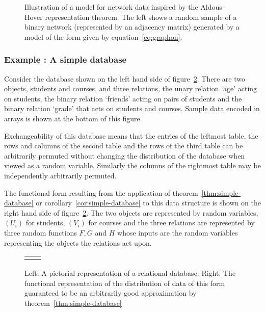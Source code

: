 \begin{figure}[ht]
\centering
\begin{tabular}{c}

\end{tabular}
\caption[Illustration of the Aldous--Hoover representation of a network.]{
Illustration of a model for network data inspired by the Aldous--Hover representation theorem.
The left shows a random sample of a binary network (represented by an adjacency matrix) generated by a model of the form given by equation~\eqref{eq:graphon}.
}
\label{fig:graphon}
\end{figure}

\subsubsection{Example : A simple database}

Consider the database shown on the left hand side of figure~\ref{fig:multi-rel-seq}.
There are two objects, students and courses, and three relations, the unary relation `age' acting on students, the binary relation `friends' acting on pairs of students and the binary relation `grade' that acts on students and courses.
Sample data encoded in arrays is shown at the bottom of this figure.

Exchangeability of this database means that the entries of the leftmost table, the rows and columns of the second table and the rows of the third table can be arbitrarily permuted without changing the distribution of the database when viewed as a random variable.
Similarly the columns of the rightmost table may be independently arbitrarily permuted.

The functional form resulting from the application of theorem~\ref{thm:simple-database} or corollary~\ref{cor:simple-database} to this data structure is shown on the right hand side of figure~\ref{fig:multi-rel-seq}.
The two objects are represented by \iid random variables, $(U_i)$ for students, $(V_i)$ for courses and the three relations are represented by three random functions $F,G$ and $H$ whose inputs are the random variables representing the objects the relations act upon.

\begin{figure}[ht]
\centering
\begin{tabular}{cc}
\tiny  & \tiny 
\end{tabular}
\caption[Illustration of a representation of an exchangeable database.]{Left: A pictorial representation of a relational database. Right: The functional representation of the distribution of data of this form guaranteed to be an arbitrarily good approximation by theorem~\ref{thm:simple-database}}
\label{fig:multi-rel-seq}
\end{figure}

